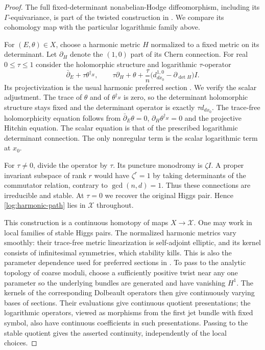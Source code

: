 \begin{proof}
The full fixed-determinant nonabelian-Hodge diffeomorphism, including
its $\Gamma$-equivariance, is part of the twisted construction in
\cite[Sections~2 and~5]{HT2003}.  We compare its cohomology map with
the particular logarithmic family above.

For $(E,\theta)\in X$, choose a harmonic metric $H$ normalized to a
fixed metric on its determinant.  Let $\partial_H$ denote the
$(1,0)$ part of its Chern connection.  For real $0\leq\tau\leq1$
consider the holomorphic structure and logarithmic $\tau$-operator
\begin{equation}
 \bar\partial_E+\tau\theta^{\dagger_H},\qquad
 \tau\partial_H+\theta+
 \frac{\tau}{n}
 \bigl(d^{1,0}_{d x_0}-\partial_{\det H}\bigr)I.
 \label{log:harmonic-path}
\end{equation}
Its projectivization is the usual harmonic preferred section
\cite[Section~4]{Simpson1997}.  We verify the scalar adjustment.
The trace of $\theta$ and of $\theta^{\dagger_H}$ is zero, so the
determinant holomorphic structure stays fixed and the determinant
operator is exactly $\tau d_{d x_0}$.  The trace-free
holomorphicity equation follows from
$\bar\partial_E\theta=0$, $\partial_H\theta^{\dagger_H}=0$ and
the projective Hitchin equation.  The scalar equation is that of
the prescribed logarithmic determinant connection.  The only
nonregular term is the scalar logarithmic term at $x_0$.

For $\tau\ne0$, divide the operator by $\tau$.
Its puncture monodromy is $\zeta I$.  A proper invariant subspace
of rank $r$ would have $\zeta^r=1$ by taking determinants of the
commutator relation, contrary to $\gcd(n,d)=1$.  Thus these
connections are irreducible and stable.  At $\tau=0$ we recover
the original Higgs pair.  Hence \eqref{log:harmonic-path} lies in
$\mathcal X$ throughout.

This construction is a continuous homotopy of maps $X\to\mathcal X$.
One may work in local families of stable Higgs pairs.  The normalized
harmonic metrics vary smoothly: their trace-free metric linearization
is self-adjoint elliptic, and its kernel consists of infinitesimal
symmetries, which stability kills.  This is also the parameter
dependence used for preferred sections in
\cite[Section~4]{Simpson1997}.  To pass to the analytic topology of
coarse moduli, choose a sufficiently positive twist near any one
parameter so the underlying bundles are generated and have vanishing
$H^1$.  The kernels of the corresponding Dolbeault operators then
give continuously varying bases of sections.  Their evaluations
give continuous quotient presentations; the logarithmic operators,
viewed as morphisms from the first jet bundle with fixed symbol,
also have continuous coefficients in such presentations.  Passing
to the stable quotient gives the asserted continuity, independently
of the local choices.


\end{proof}
